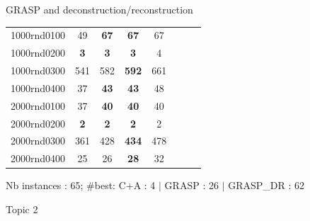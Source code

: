 \documentclass[10pt,xcolor=dvipsnames]{beamer}
\begin{document}
\begin{frame}{GRASP and deconstruction/reconstruction}
{\begin{center}
\begin{tabular}{|c|c|c|c|c|r|c|c|}
\hline
 1000rnd0100 & 49 & \textbf{67} & \textbf{67} & 67    \\
 1000rnd0200 & \textbf{3} & \textbf{3} & \textbf{3} & 4    \\
 1000rnd0300 & 541 & 582 & \textbf{592} & 661    \\
 1000rnd0400 & 37 & \textbf{43} & \textbf{43} & 48    \\
\hline
 2000rnd0100 & 37 & \textbf{40} & \textbf{40} & 40    \\
 2000rnd0200 & \textbf{2} & \textbf{2} & \textbf{2} & 2    \\
 2000rnd0300 & 361 & 428 & \textbf{434} & 478    \\
 2000rnd0400 & 25 & 26 & \textbf{28} & 32    \\
\hline
\end{tabular}
\end{center}
}

Nb instances : 65; \#best:  C+A : 4 $\mid$ GRASP : 26 $\mid$ GRASP\_DR : 62

\end{frame}


\begin{frame}[standout]

Topic 2

\end{frame}
\end{document}
